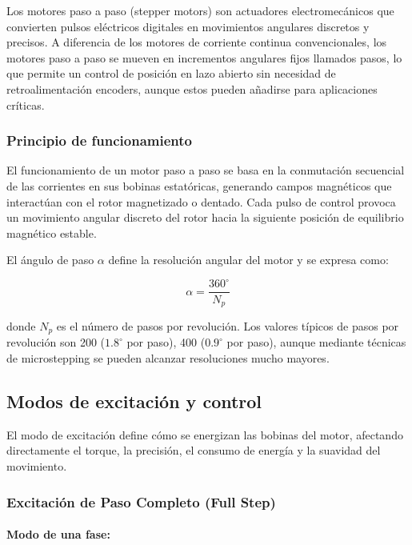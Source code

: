
Los motores paso a paso (stepper motors) son actuadores electromecánicos que convierten pulsos eléctricos digitales en movimientos angulares discretos y precisos. A diferencia de los motores de corriente continua convencionales, los motores paso a paso se mueven en incrementos angulares fijos llamados pasos, lo que permite un control de posición en lazo abierto sin necesidad de retroalimentación encoders, aunque estos pueden añadirse para aplicaciones críticas.

\subsubsection{Principio de funcionamiento}

El funcionamiento de un motor paso a paso se basa en la conmutación secuencial de las corrientes en sus bobinas estatóricas, generando campos magnéticos que interactúan con el rotor magnetizado o dentado. Cada pulso de control provoca un movimiento angular discreto del rotor hacia la siguiente posición de equilibrio magnético estable.

El ángulo de paso $\alpha$ define la resolución angular del motor y se expresa como:

\begin{equation}
\alpha = \frac{360^\circ}{N_p}
\end{equation}

donde $N_p$ es el número de pasos por revolución. Los valores típicos de pasos por revolución son 200 ($1.8^\circ$ por paso), 400 ($0.9^\circ$ por paso), aunque mediante técnicas de microstepping se pueden alcanzar resoluciones mucho mayores.

\subsection{Modos de excitación y control}

El modo de excitación define cómo se energizan las bobinas del motor, afectando directamente el torque, la precisión, el consumo de energía y la suavidad del movimiento.

\subsubsection{Excitación de Paso Completo (Full Step)}

\paragraph{Modo de una fase:}

